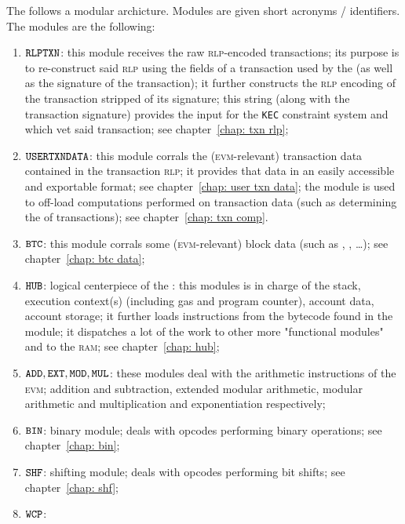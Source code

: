 The \zkEvm{} follows a modular archicture. Modules are given short acronyms / identifiers. The modules are the following:
\begin{enumerate}
	\item $\texttt{RLPTXN}$:
		this module receives the raw \textsc{rlp}-encoded transactions;
		its purpose is to re-construct said \textsc{rlp} using the fields of a transaction used by the \zkEvm{} (as well as the signature of the transaction);
		it further constructs the \textsc{rlp} encoding of the transaction stripped of its signature;
		this string (along with the transaction signature) provides the input for the \texttt{KEC} constraint system and \instEcrecover{} which vet said transaction;
		see chapter~\ref{chap: txn rlp};
	\item $\texttt{USERTXNDATA}{}$:
		this module corrals the (\textsc{evm}-relevant) transaction data contained in the transaction \textsc{rlp};
		it provides that data in an easily accessible and exportable format;
		see chapter~\ref{chap: user txn data};
		\saNote{} the \btcMod{} module is used to off-load computations performed on transaction data (such as determining the  of \cite{EIP-1559} transactions);
		see chapter~\ref{chap: txn comp}.
	\item $\texttt{BTC}{}$:
		this module corrals some (\textsc{evm}-relevant) block data (such as , , \dots);
		see chapter~\ref{chap: btc data};
	\item $\texttt{HUB}{}$:
		logical centerpiece of the \zkEvm{}: this modules is in charge of the stack, execution context(s) (including gas and program counter), account data, account storage;
		it further loads instructions from the bytecode found in the \romMod{} module;
		it dispatches a lot of the work to other more "functional modules" and to the \textsc{ram};
		see chapter~\ref{chap: hub};
	\item $\texttt{ADD}{}, \texttt{EXT}{}, \texttt{MOD}{}, \texttt{MUL}{}$:
		these modules deal with the arithmetic instructions of the \textsc{evm};
		addition and subtraction, extended modular arithmetic, modular arithmetic and multiplication and exponentiation respectively;
	\item $\texttt{BIN}{}$:
		binary module;
		deals with opcodes performing binary operations;
		see chapter~\ref{chap: bin};
	\item $\texttt{SHF}{}$:
		shifting module;
		deals with opcodes performing bit shifts;
		see chapter~\ref{chap: shf};
	\item $\texttt{WCP}{}$:

\end{enumerate}
